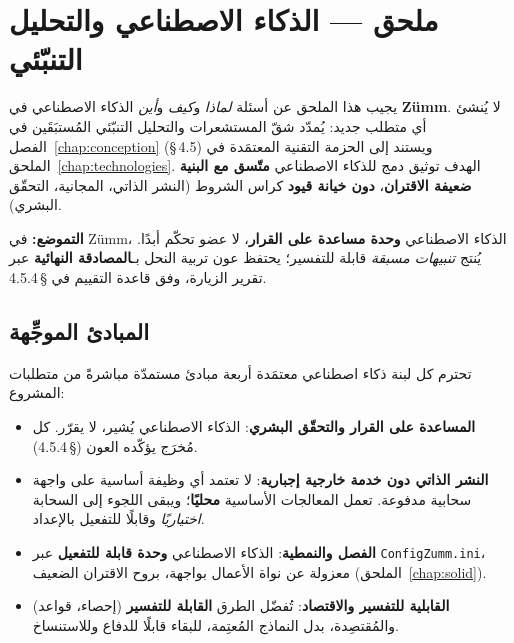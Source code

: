
\chapter{ملحق --- الذكاء الاصطناعي والتحليل التنبّئي}
\label{chap:ia}
يجيب هذا الملحق عن أسئلة \emph{لماذا} و\emph{كيف} و\emph{أين} الذكاء الاصطناعي
في \textbf{Zümm}. لا يُنشئ أي متطلب جديد: يُمدّد شقّ المستشعرات والتحليل التنبّئي
المُستبَقَين في الفصل~\ref{chap:conception} (§\,4.5) ويستند إلى الحزمة التقنية
المعتمَدة في الملحق~\ref{chap:technologies}. الهدف توثيق دمج للذكاء
الاصطناعي \textbf{متّسق مع البنية ضعيفة الاقتران}، \textbf{دون خيانة قيود} كراس
الشروط (النشر الذاتي، المجانية، التحقّق البشري).

\begin{encadre}
\textbf{التموضع:} في Zümm، الذكاء الاصطناعي \textbf{وحدة مساعدة على القرار}، لا
عضو تحكّم أبدًا. يُنتج \emph{تنبيهات مسبقة} قابلة للتفسير؛ يحتفظ عون تربية النحل
بـ\textbf{المصادقة النهائية} عبر تقرير الزيارة، وفق قاعدة التقييم في §\,4.5.4.
\end{encadre}

\section{المبادئ الموجِّهة}
تحترم كل لبنة ذكاء اصطناعي معتمَدة أربعة مبادئ مستمدّة مباشرةً من متطلبات المشروع:
\begin{itemize}
  \item \textbf{المساعدة على القرار والتحقّق البشري}: الذكاء الاصطناعي يُشير، لا يقرّر. كل مُخرَج يؤكّده العون (§\,4.5.4).
  \item \textbf{النشر الذاتي دون خدمة خارجية إجبارية}: لا تعتمد أي وظيفة أساسية على واجهة سحابية مدفوعة. تعمل المعالجات الأساسية \textbf{محليًا}؛ ويبقى اللجوء إلى السحابة \emph{اختياريًا} وقابلًا للتفعيل بالإعداد.
  \item \textbf{الفصل والنمطية}: الذكاء الاصطناعي \textbf{وحدة قابلة للتفعيل} عبر \texttt{ConfigZumm.ini}، معزولة عن نواة الأعمال بواجهة، بروح الاقتران الضعيف (الملحق~\ref{chap:solid}).
  \item \textbf{القابلية للتفسير والاقتصاد}: تُفضّل الطرق \textbf{القابلة للتفسير} (إحصاء، قواعد) والمُقتصِدة، بدل النماذج المُعتِمة، للبقاء قابلًا للدفاع وللاستنساخ.
\end{itemize}

